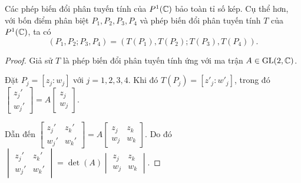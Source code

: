 \begin{prop}\label{prop 2.2.15}
    Các phép biến đổi phân tuyến tính của $P^1(\mathbb{C})$ bảo toàn tỉ số kép. Cụ thể hơn, với bốn điểm phân biệt $P_1,P_2,P_3,P_4$ và phép biến đổi phân tuyến tính $T$ của $P^1(\mathbb{C})$, ta có
    \[(P_1,P_2;P_3,P_4) = (T(P_1),T(P_2);T(P_3),T(P_4)).\]
\end{prop}
\begin{proof}
    Giả sử $T$ là phép biến đổi phân tuyến tính ứng với ma trận $A\in \operatorname{GL}(2,\mathbb{C})$. 
    
    Đặt $P_j=[z_j:w_j]$ với $j=1,2,3,4$. Khi đó $T(P_j) = [z'_j:w'_j]$, trong đó $\begin{bmatrix}
        z_j' \\
        w_j'
    \end{bmatrix} = A\begin{bmatrix}
        z_j \\
        w_j
    \end{bmatrix}$.

    Dẫn đến $\begin{bmatrix}
        z_j' & z_k'\\
        w_j' & w_k'
    \end{bmatrix} = A\begin{bmatrix}
        z_j & z_k\\
        w_j & w_k
    \end{bmatrix}$. Do đó $\begin{vmatrix}
        z_j' & z_k'\\
        w_j' & w_k'
    \end{vmatrix} = \det(A)\begin{vmatrix}
        z_j & z_k\\
        w_j & w_k
    \end{vmatrix}$.


\end{proof}
